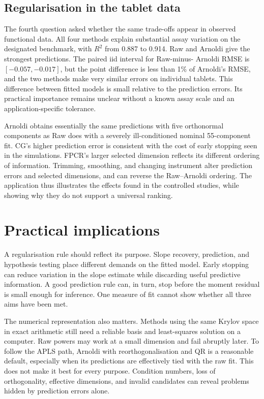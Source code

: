 \subsection{Regularisation in the tablet data}

The fourth question asked whether the same trade-offs appear in observed
functional data.  All four methods explain substantial assay variation on
the designated benchmark, with $R^2$ from 0.887 to 0.914.  Raw and Arnoldi
give the strongest predictions.  The paired iid interval for Raw-minus-
Arnoldi RMSE is $[-0.057,-0.017]$, but the point difference is less than
1\% of Arnoldi's RMSE, and the two methods make very similar errors on
individual tablets.  This difference between fitted models is small
relative to the prediction errors.  Its practical importance remains
unclear without a known assay scale and an application-specific tolerance.

Arnoldi obtains essentially the same predictions with five orthonormal
components as Raw does with a severely ill-conditioned nominal
55-component fit.  CG's higher prediction error is consistent with the
cost of early stopping seen in the simulations.  FPCR's larger selected
dimension reflects its different ordering of information.  Trimming,
smoothing, and changing instrument alter prediction errors and selected
dimensions, and can reverse the Raw--Arnoldi ordering.  The application
thus illustrates the effects found in the controlled studies, while
showing why they do not support a universal ranking.

\section{Practical implications}
\label{sec:conclusion-implications}

A regularisation rule should reflect its purpose.  Slope recovery, prediction,
and hypothesis testing place different demands on the fitted model.  Early
stopping can reduce variation in the slope estimate while discarding useful
predictive information.  A good prediction rule can, in turn, stop before the
moment residual is small enough for inference.  One measure of fit cannot
show whether all three aims have been met.

The numerical representation also matters.  Methods using the same Krylov
space in exact arithmetic still need a reliable basis and least-squares
solution on a computer.
Raw powers may work at a small dimension and fail abruptly later.  To follow
the APLS path, Arnoldi with reorthogonalisation and QR is a reasonable default,
especially when its predictions are effectively tied with the raw fit.  This
does not make it best for every purpose.  Condition numbers, loss of
orthogonality, effective dimensions, and invalid candidates can reveal
problems hidden by prediction errors alone.


